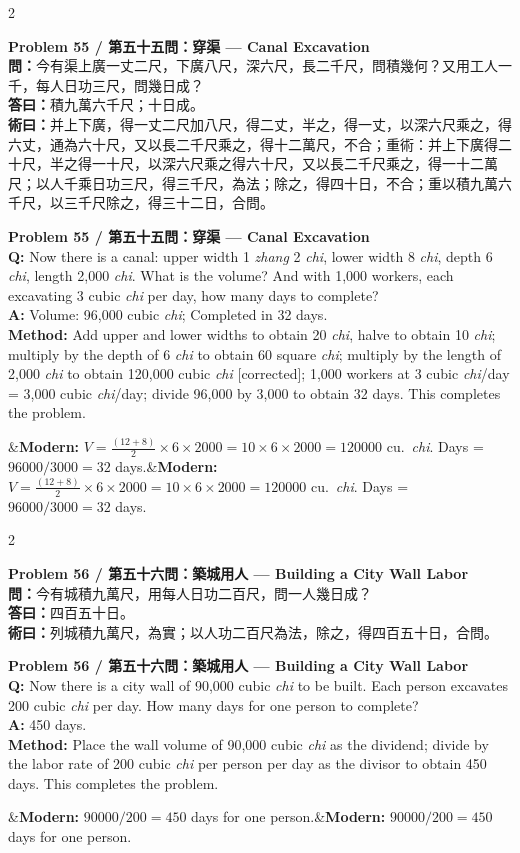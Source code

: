 \documentclass[11pt,a4paper]{article}
\newcommand{\bilingualproblem}[4]{%
  \begin{paracol}{2}
  \begin{leftcolumn}
  \noindent\textbf{\color{problemcolor}#1}\\[0.2cm]
  #2
  \end{leftcolumn}
  \switchcolumn
  \noindent\textbf{\color{problemcolor}#1}\\[0.2cm]
  #3
  \end{paracol}
  \ifx&#4&\else\vspace{0.3cm}\noindent#4\fi
  \vspace{0.5cm}
}
\newcommand{\wen}[1]{\textcolor{problemcolor}{\textbf{問：}}#1}
\newcommand{\da}[1]{\textcolor{answercolor}{\textbf{答曰：}}#1}
\newcommand{\shu}[1]{\textcolor{methodcolor}{\textbf{術曰：}}#1}
\newcommand{\wenen}[1]{\textcolor{problemcolor}{\textbf{Q:}} #1}
\newcommand{\daen}[1]{\textcolor{answercolor}{\textbf{A:}} #1}
\newcommand{\shuen}[1]{\textcolor{methodcolor}{\textbf{Method:}} #1}
\begin{document}
\bilingualproblem{Problem 55 / 第五十五問：穿渠 --- Canal Excavation}{
\wen{今有渠上廣一丈二尺，下廣八尺，深六尺，長二千尺，問積幾何？又用工人一千，每人日功三尺，問幾日成？}\\[0.2cm]
\da{積九萬六千尺；十日成。}\\[0.2cm]
\shu{并上下廣，得一丈二尺加八尺，得二丈，半之，得一丈，以深六尺乘之，得六丈，通為六十尺，又以長二千尺乘之，得十二萬尺，不合；重術：并上下廣得二十尺，半之得一十尺，以深六尺乘之得六十尺，又以長二千尺乘之，得一十二萬尺；以人千乘日功三尺，得三千尺，為法；除之，得四十日，不合；重以積九萬六千尺，以三千尺除之，得三十二日，合問。}
}{
\wenen{Now there is a canal: upper width 1 \textit{zhang} 2 \textit{chi}, lower width 8 \textit{chi}, depth 6 \textit{chi}, length 2,000 \textit{chi}. What is the volume? And with 1,000 workers, each excavating 3 cubic \textit{chi} per day, how many days to complete?}\\[0.2cm]
\daen{Volume: 96,000 cubic \textit{chi}; Completed in 32 days.}\\[0.2cm]
\shuen{Add upper and lower widths to obtain 20 \textit{chi}, halve to obtain 10 \textit{chi}; multiply by the depth of 6 \textit{chi} to obtain 60 square \textit{chi}; multiply by the length of 2,000 \textit{chi} to obtain 120,000 cubic \textit{chi} [corrected]; 1,000 workers at 3 cubic \textit{chi}/day = 3,000 cubic \textit{chi}/day; divide 96,000 by 3,000 to obtain 32 days. This completes the problem.}
}{\textbf{Modern:} $V = \frac{(12+8)}{2} \times 6 \times 2000 = 10 \times 6 \times 2000 = 120000$ cu.\ \textit{chi}. Days = $96000 / 3000 = 32$ days.}

\newpage

\bilingualproblem{Problem 56 / 第五十六問：築城用人 --- Building a City Wall Labor}{
\wen{今有城積九萬尺，用每人日功二百尺，問一人幾日成？}\\[0.2cm]
\da{四百五十日。}\\[0.2cm]
\shu{列城積九萬尺，為實；以人功二百尺為法，除之，得四百五十日，合問。}
}{
\wenen{Now there is a city wall of 90,000 cubic \textit{chi} to be built. Each person excavates 200 cubic \textit{chi} per day. How many days for one person to complete?}\\[0.2cm]
\daen{450 days.}\\[0.2cm]
\shuen{Place the wall volume of 90,000 cubic \textit{chi} as the dividend; divide by the labor rate of 200 cubic \textit{chi} per person per day as the divisor to obtain 450 days. This completes the problem.}
}{\textbf{Modern:} $90000 / 200 = 450$ days for one person.}
\end{document}
